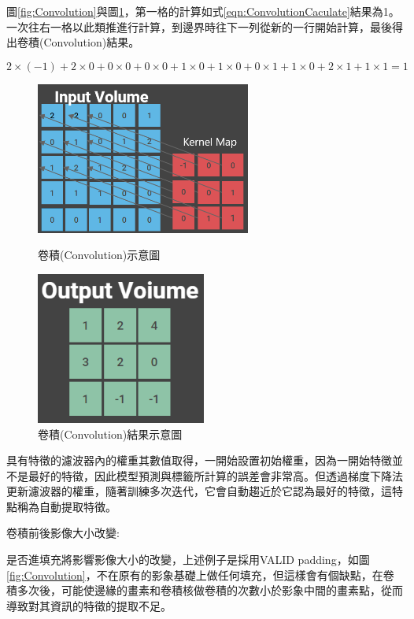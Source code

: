 %


圖\ref{fig:Convolution}與圖\ref{fig:ConvolutionFinally}，第一格的計算如式\ref{eqn:ConvolutionCaculate}結果為1。一次往右一格以此類推進行計算，到邊界時往下一列從新的一行開始計算，最後得出卷積(Convolution)結果。

\begin{equation}
	\label{eqn:ConvolutionCaculate}
	2\times(-1)+2\times0+0\times0+0\times0+1\times0+1\times0+0\times1+1\times0+2\times1+1\times1=1
\end{equation}


\begin{figure}[H]
	\centerline{\includegraphics[height=5cm]{pic/CNN1.png}}
	\caption{卷積(Convolution)示意圖}
	\label{fig:Convolution}

	\centerline{\includegraphics[height=5cm]{pic/CNN2.PNG}}
	\caption{卷積(Convolution)結果示意圖}
	\label{fig:ConvolutionFinally}
\end{figure}


\newpage
具有特徵的濾波器內的權重其數值取得，一開始設置初始權重，因為一開始特徵並不是最好的特徵，因此模型預測與標籤所計算的誤差會非常高。但透過梯度下降法更新濾波器的權重，隨著訓練多次迭代，它會自動趨近於它認為最好的特徵，這特點稱為自動提取特徵。


卷積前後影像大小改變:

是否進填充將影響影像大小的改變，上述例子是採用VALID padding，如圖\ref{fig:Convolution}，不在原有的影象基礎上做任何填充，但這樣會有個缺點，在卷積多次後，可能使邊緣的畫素和卷積核做卷積的次數小於影象中間的畫素點，從而導致對其資訊的特徵的提取不足。


